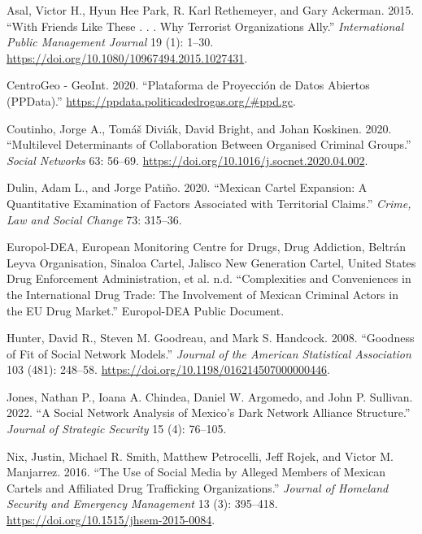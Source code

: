 \documentclass[
]{article}
\newlength{\cslhangindent}
\newenvironment{CSLReferences}[2] %
 {\begin{list}{}{%
  \setlength{\itemindent}{0pt}
  \setlength{\leftmargin}{0pt}
  \setlength{\parsep}{0pt}
  \ifodd #1
   \setlength{\leftmargin}{\cslhangindent}
   \setlength{\itemindent}{-1\cslhangindent}
  \fi
  \setlength{\itemsep}{#2\baselineskip}}}
 {\end{list}}
\begin{document}
\label{refs}
\begin{CSLReferences}{1}{0}
Asal, Victor H., Hyun Hee Park, R. Karl Rethemeyer, and Gary Ackerman.
2015. {``With Friends Like These . . . Why Terrorist Organizations
Ally.''} \emph{International Public Management Journal} 19 (1): 1--30.
\url{https://doi.org/10.1080/10967494.2015.1027431}.

CentroGeo - GeoInt. 2020. {``Plataforma de Proyección de Datos Abiertos
(PPData).''} \url{https://ppdata.politicadedrogas.org/\#ppd.gc}.

Coutinho, Jorge A., Tomáš Diviák, David Bright, and Johan Koskinen.
2020. {``Multilevel Determinants of Collaboration Between Organised
Criminal Groups.''} \emph{Social Networks} 63: 56--69.
\url{https://doi.org/10.1016/j.socnet.2020.04.002}.

Dulin, Adam L., and Jorge Patiño. 2020. {``Mexican Cartel Expansion: A
Quantitative Examination of Factors Associated with Territorial
Claims.''} \emph{Crime, Law and Social Change} 73: 315--36.

Europol-DEA, European Monitoring Centre for Drugs, Drug Addiction,
Beltrán Leyva Organisation, Sinaloa Cartel, Jalisco New Generation
Cartel, United States Drug Enforcement Administration, et al. n.d.
{``Complexities and Conveniences in the International Drug Trade: The
Involvement of Mexican Criminal Actors in the EU Drug Market.''}
Europol-DEA Public Document.

Hunter, David R., Steven M. Goodreau, and Mark S. Handcock. 2008.
{``Goodness of Fit of Social Network Models.''} \emph{Journal of the
American Statistical Association} 103 (481): 248--58.
\url{https://doi.org/10.1198/016214507000000446}.

Jones, Nathan P., Ioana A. Chindea, Daniel W. Argomedo, and John P.
Sullivan. 2022. {``A Social Network Analysis of Mexico's Dark Network
Alliance Structure.''} \emph{Journal of Strategic Security} 15 (4):
76--105.

Nix, Justin, Michael R. Smith, Matthew Petrocelli, Jeff Rojek, and
Victor M. Manjarrez. 2016. {``The Use of Social Media by Alleged Members
of Mexican Cartels and Affiliated Drug Trafficking Organizations.''}
\emph{Journal of Homeland Security and Emergency Management} 13 (3):
395--418. \url{https://doi.org/10.1515/jhsem-2015-0084}.


\end{CSLReferences}
\end{document}
